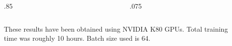 \documentclass[final]{beamer}
\newlength{\onecolwid}
\newlength{\twocolwid}
\begin{document}
\begin{frame}[t]
\begin{columns}[t]
\begin{column}{\twocolwid}
\begin{columns}[t,totalwidth=.7\twocolwid]
\begin{column}{.85\twocolwid}
    \end{column}
    \begin{column}{.075\twocolwid}\end{column}
  \end{columns}



%
%


\begin{columns}[t,totalwidth=\twocolwid] %

\begin{column}{\onecolwid} %

\begin{block}{}
These results have been obtained using NVIDIA K80 GPUs. Total training time was roughly 10 hours. Batch size used is 64.

\end{block}


\end{column} %

\begin{column}{\onecolwid} %

\begin{block}{}
{\footnotesize


}
\end{block}



\end{column}
\end{columns}
\end{column}
\end{columns}
\end{frame}
\end{document}
